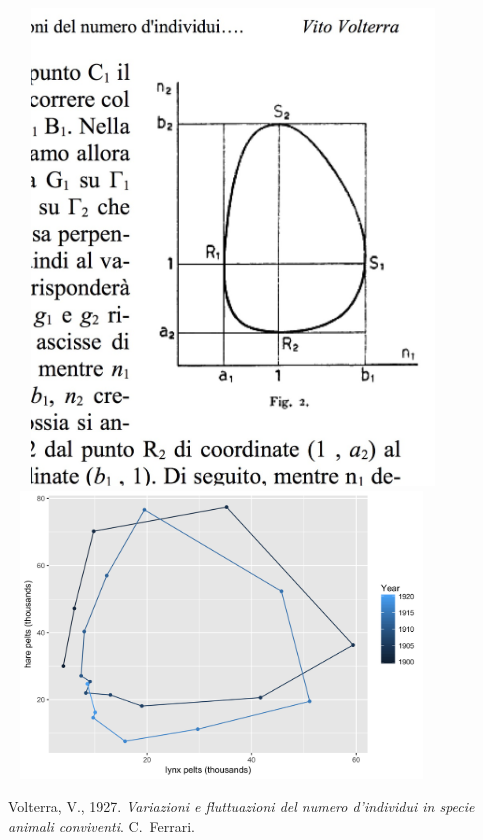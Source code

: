 \documentclass[10pt]{report}
\begin{document}
\begin{minipage}[t]{0.3\textwidth}
\mbox{ }
\vspace*{0.5in}
\mbox{ } \hfill
\includegraphics[width=0.8\textwidth]{img/volterra-orbit.jpg}
\\[-8pt]
\mbox{ }
\hfill
\includegraphics[width=0.8\textwidth]{img/hare-lynx-pelts-2.png}
\end{minipage}
\vfill
\hfill
{\tiny
Volterra, V., 1927. {\slshape Variazioni
e fluttuazioni del numero d'individui in specie animali
conviventi}. C.~Ferrari.
}
\end{document}
